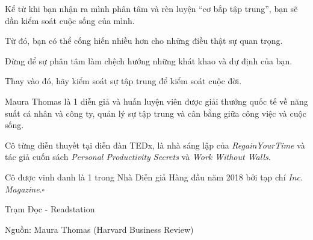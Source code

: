 \documentclass{book}
\numberwithin{equation}{section}
\begin{document}
Kể từ khi bạn nhận ra mình phân tâm và rèn luyện ``cơ bắp tập trung'', bạn sẽ dần kiểm soát cuộc sống của mình.

Từ đó, bạn có thể cống hiến nhiều hơn cho những điều thật sự quan trọng.

Đừng để sự phân tâm làm chệch hướng những khát khao và dự định của bạn.

Thay vào đó, hãy kiểm soát sự tập trung để kiểm soát cuộc đời.

%
Maura Thomas là 1 diễn giả và huấn luyện viên được giải thưởng quốc tế về năng suất cá nhân và công ty, quản lý sự tập trung và cân bằng giữa công việc và cuộc sống.

Cô từng diễn thuyết tại diễn đàn TEDx, là nhà sáng lập của \textit{RegainYourTime} và tác giả cuốn sách \textit{Personal Productivity Secrets} và \textit{Work Without Walls}.

Cô được vinh danh là 1 trong Nhà Diễn giả Hàng đầu năm 2018 bởi tạp chí \textit{Inc. Magazine}.\hfill$\square$
\begin{flushright}
    Trạm Đọc - Readstation
    
    Nguồn: Maura Thomas (Harvard Business Review)
\end{flushright}


\printbibliography[heading=bibintoc]
\end{document}
